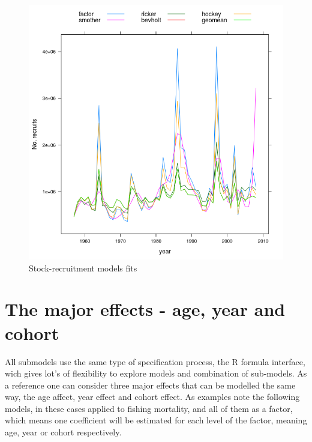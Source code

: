 \documentclass[a4paper,english,10pt]{article}\usepackage[]{graphicx}\usepackage[]{color}
\newenvironment{knitrout}{}{} %
\begin{document}
\begin{knitrout}
\color{fgcolor}\begin{figure}[H]

{\centering \includegraphics[width=.9\linewidth]{figure/srmod-1} 

}

\caption[Stock-recruitment models fits]{Stock-recruitment models fits}\label{fig:srmod}
\end{figure}


\end{knitrout}

\section{The major effects - age, year and cohort}

All submodels use the same type of specification process, the R formula interface, wich gives lot's of flexibility to explore models and combination of sub-models. As a reference one can consider three major effects that can be modelled the same way, the age affect, year effect and cohort effect. As examples note the following models, in these cases applied to fishing mortality, and all of them as a factor, which means one coefficient will be estimated for each level of the factor, meaning age, year or cohort respectively.
\end{document}
